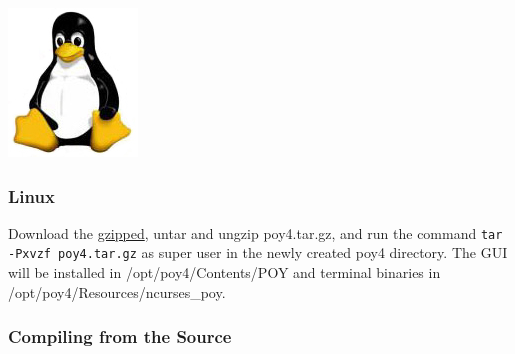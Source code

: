 \begin{flushleft}
	\begin{minipage}[c]{0.074\textwidth}
   		\includegraphics[width=\textwidth]{figures/figLogoLinux.jpg}
	\end{minipage}
	\quad
	\begin{minipage}[t]{0.88\textwidth}
	   	\subsubsection{Linux}
	\end{minipage}

    Download the 
    \href{http://research.amnh.org/scicomp/projects/poy.php}{gzipped}, untar and
    ungzip poy4.tar.gz, and  run the command \texttt{tar -Pxvzf poy4.tar.gz} as
    super user in the newly created poy4 directory.
    The GUI will be installed in /opt/poy4/Contents/POY and terminal binaries in
    /opt/poy4/Resources/ncurses\_poy.
\end{flushleft}


\subsubsection{Compiling from the Source}


